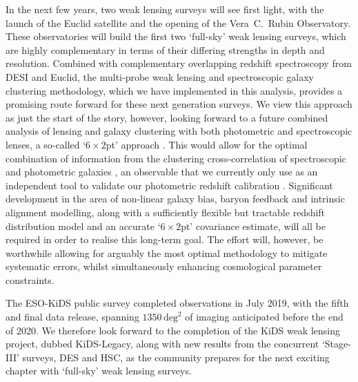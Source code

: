 In the next few years, two weak lensing surveys will see first light, with the launch of the Euclid satellite and the opening of the Vera~C.~Rubin Observatory.   These observatories will build the first two `full-sky' weak lensing surveys, which are highly complementary in terms of their differing strengths in depth and resolution.  Combined with complementary overlapping redshift spectroscopy from DESI and Euclid, the multi-probe weak lensing and spectroscopic galaxy clustering methodology, which we have implemented in this analysis, provides a promising route forward for these next generation surveys.   We view this \tttp approach as just the start of the story, however, looking forward to a future combined analysis of lensing and galaxy clustering with both photometric and spectroscopic lenses, a so-called `$6\times2$pt' approach \citep{bernstein:2009}.    This would allow for the optimal combination of information from the clustering cross-correlation of spectroscopic and photometric galaxies \citep{newman:2008}, an observable that we currently only use as an independent tool to validate our photometric redshift calibration \citep{hildebrandt/etal:inprep}.      Significant development in the area of non-linear galaxy bias, baryon feedback and intrinsic alignment modelling, along with a sufficiently flexible but tractable redshift distribution model and an accurate `$6\times2$pt' covariance estimate, will all be required in order to realise this long-term goal.   The effort will, however, be worthwhile allowing for arguably the most optimal methodology to mitigate systematic errors, whilst simultaneously enhancing cosmological parameter constraints.

The ESO-KiDS public survey completed observations in July 2019, with the fifth and final data release, spanning $1350\,\mathrm{deg}^{2}$ of imaging anticipated before the end of 2020.  We therefore look forward to the completion of the KiDS weak lensing project, dubbed KiDS-Legacy, along with new results from the concurrent `Stage-III' surveys, DES and HSC, as the community prepares for the next exciting chapter with `full-sky' weak lensing surveys.  